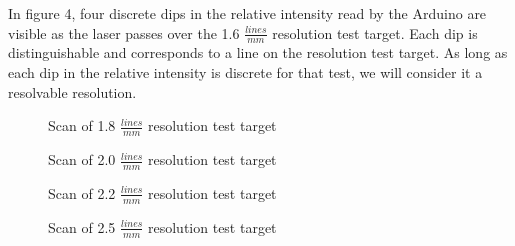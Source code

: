\documentclass[letterpaper, 12pt]{article}
\begin{document}
\par
In figure 4, four discrete dips in the relative intensity read by the Arduino are visible as the laser passes over the 1.6 $\frac{lines}{mm}$ resolution test target. Each dip is distinguishable and corresponds to a line on the resolution test target. As long as each dip in the relative intensity is discrete for that test, we will consider it a resolvable resolution.

  \datatwo
\begin{figure}[H]
  \centering
  \caption[caption]{Scan of 1.8 {$\frac{lines}{mm}$} resolution test target}
\end{figure}

  \datathree
\begin{figure}[H]
  \centering
  \caption[caption]{Scan of 2.0 {$\frac{lines}{mm}$} resolution test target}
\end{figure}

  \datathree
\begin{figure}[H]
  \centering
  \caption[caption]{Scan of 2.2 {$\frac{lines}{mm}$} resolution test target}
\end{figure}

  \datathree
\begin{figure}[H]
  \centering
  \caption[caption]{Scan of 2.5 {$\frac{lines}{mm}$} resolution test target}
\end{figure}
\end{document}
